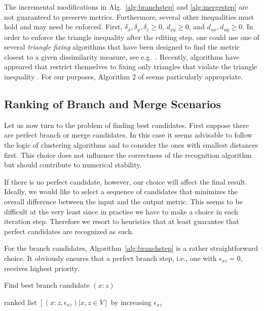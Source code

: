 \documentclass{article}
\begin{document}
The incremental modifications in Alg.~\ref{alg:branchstep} and
\ref{alg:mergestep} are not guaranteed to preserve metrics. Furthermore,
several other inequalities must hold and may need be enforced. First,
$\delta_x,\delta_y,\delta_z\ge 0$, $d_{xy}\ge 0$, and $d_{ux},d_{uy}\ge
0$. In order to enforce the triangle inequality after the editing step, one
could use one of several \emph{triangle fixing} algorithms that have been
designed to find the metric closest to a given dissimilarity measure, see
e.g.\ \cite{Sra:05,Brickel:08}. Recently, algorithms have appeared that
restrict themselves to fixing only triangles that violate the triangle
inequality \cite{Gilbert:17}. For our purposes, Algorithm 2 of
\cite{Gilbert:17} seems particularly appropriate.

\subsection{Ranking of Branch and Merge Scenarios}

Let us now turn to the problem of finding best candidates. First suppose
there are perfect branch or merge candidates. In this case it seems
advisable to follow the logic of clustering algorithms and to consider the 
ones with smallest distances first. This choice does not influence the
correctness of the recognition algorithm but should contribute to numerical
stability.

If there is no perfect candidate, however, our choice will affect the final
result. Ideally, we would like to select a sequence of candidates that
minimizes the overall difference between the input and the output metric.
This seems to be difficult at the very least since in practise we have to
make a choice in each iteration step. Therefore we resort to heuristics
that at least guarantee that perfect candidates are recognized as such.

For the branch candidates, Algorithm~\ref{alg:branchstep} is a rather
straightforward choice. It obviously ensures that a perfect branch step,
i.e., one with $\epsilon_{xz}=0$, receives highest priority.

\begin{algorithm}[H]
\caption{Find best branch candidate $(x:z)$ } 
\label{alg:branchstep}
\SetAlgoLined
{}
\Return ranked list $[(x:z,\epsilon_{xz})| x,z\in V]$ by increasing 
$\epsilon_{xz}$\;
\end{algorithm} 
\end{document}
